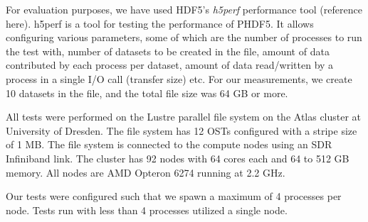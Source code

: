 For evaluation purposes, we have used HDF5's \textit{h5perf} performance tool (reference here). h5perf is a tool for testing the performance of PHDF5. It allows configuring various parameters, some of which are the number of processes to run the test with, number of datasets to be created in the file, amount of data contributed by each process per dataset, amount of data read/written by a process in a single I/O call (transfer size) etc. For our measurements, we create 10 datasets in the file, and the total file size was 64 GB or more.

All tests were performed on the Lustre parallel file system on the Atlas cluster at University of Dresden. The file system has 12 OSTs configured with a stripe size of 1 MB. The file system is connected to the compute nodes using an SDR Infiniband link. 
The cluster has 92 nodes with 64 cores each and 64 to 512 GB memory. All nodes are AMD Opteron 6274 running at 2.2 GHz.

Our tests were configured such that we spawn a maximum of 4 processes per node. Tests run with less than 4 processes utilized a single node. 

%


